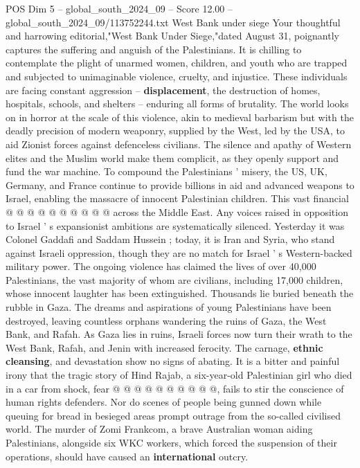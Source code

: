 \begin{textsample}{POS Dim 5 – global\_south\_2024\_09 – Score 12.00 – global\_south\_2024\_09/113752244.txt}  \label{ex:f5_pos_257}
West Bank under siege Your thoughtful and harrowing editorial,"West Bank Under Siege,"dated August 31, poignantly captures the suffering and anguish of the Palestinians.
It is chilling to contemplate the plight of unarmed women, children, and youth who are trapped and subjected to unimaginable violence, cruelty, and injustice.
These individuals are facing constant aggression -- \textbf{displacement}, the destruction of homes, hospitals, schools, and shelters -- enduring all forms of brutality.
The world looks on in horror at the scale of this violence, akin to medieval barbarism but with the deadly precision of modern weaponry, supplied by the West, led by the USA, to aid Zionist forces against defenceless civilians.
The silence and apathy of Western elites and the Muslim world make them complicit, as they openly support and fund the war machine.
To compound the Palestinians ' misery, the US, UK, Germany, and France continue to provide billions in aid and advanced weapons to Israel, enabling the massacre of innocent Palestinian children.
This vast financial @ @ @ @ @ @ @ @ @ @ across the Middle East.
Any voices raised in opposition to Israel ' s expansionist ambitions are systematically silenced.
Yesterday it was Colonel Gaddafi and Saddam Hussein ; today, it is Iran and Syria, who stand against Israeli oppression, though they are no match for Israel ' s Western-backed military power.
The ongoing violence has claimed the lives of over 40,000 Palestinians, the vast majority of whom are civilians, including 17,000 children, whose innocent laughter has been extinguished.
Thousands lie buried beneath the rubble in Gaza.
The dreams and aspirations of young Palestinians have been destroyed, leaving countless orphans wandering the ruins of Gaza, the West Bank, and Rafah.
As Gaza lies in ruins, Israeli forces now turn their wrath to the West Bank, Rafah, and Jenin with increased ferocity.
The carnage, \textbf{ethnic} \textbf{cleansing}, and devastation show no signs of abating.
It is a bitter and painful irony that the tragic story of Hind Rajab, a six-year-old Palestinian girl who died in a car from shock, fear @ @ @ @ @ @ @ @ @ @, fails to stir the conscience of human rights defenders.
Nor do scenes of people being gunned down while queuing for bread in besieged areas prompt outrage from the so-called civilised world.
The murder of Zomi Frankcom, a brave Australian woman aiding Palestinians, alongside six WKC workers, which forced the suspension of their operations, should have caused an \textbf{international} outcry.

\end{textsample}
